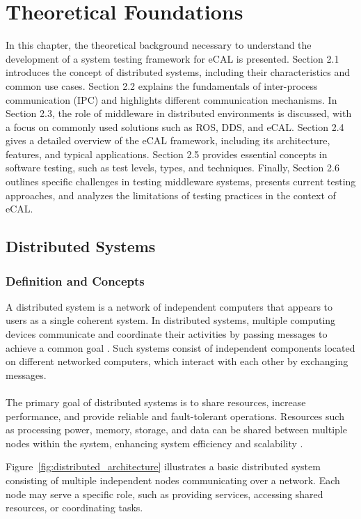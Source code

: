 \clearpage
\section{Theoretical Foundations}

In this chapter, the theoretical background necessary to understand the development of a system testing framework for eCAL is presented. Section 2.1 introduces the concept of distributed systems, including their characteristics and common use cases. Section 2.2 explains the fundamentals of inter-process communication (IPC) and highlights different communication mechanisms. In Section 2.3, the role of middleware in distributed environments is discussed, with a focus on commonly used solutions such as ROS, DDS, and eCAL. Section 2.4 gives a detailed overview of the eCAL framework, including its architecture, features, and typical applications. Section 2.5 provides essential concepts in software testing, such as test levels, types, and techniques. Finally, Section 2.6 outlines specific challenges in testing middleware systems, presents current testing approaches, and analyzes the limitations of testing practices in the context of eCAL.

\subsection{Distributed Systems}

\subsubsection{Definition and Concepts}

A distributed system is a network of independent computers that appears to users as a single coherent system. In distributed systems, multiple computing devices communicate and coordinate their activities by passing messages to achieve a common goal \cite{tanenbaum2017}. Such systems consist of independent components located on different networked computers, which interact with each other by exchanging messages.
\\
\\
The primary goal of distributed systems is to share resources, increase performance, and provide reliable and fault-tolerant operations. Resources such as processing power, memory, storage, and data can be shared between multiple nodes within the system, enhancing system efficiency and scalability \cite{coulouris2012}.

Figure~\ref{fig:distributed_architecture} illustrates a basic distributed system consisting of multiple independent nodes communicating over a network. Each node may serve a specific role, such as providing services, accessing shared resources, or coordinating tasks.

